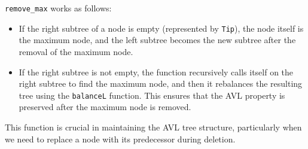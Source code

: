 \texttt{remove\_max} works as follows:
\begin{itemize}
    \item If the right subtree of a node is empty (represented by \texttt{Tip}), the node itself is the maximum node, and the left subtree becomes the new subtree after the removal of the maximum node.
    \item If the right subtree is not empty, the function recursively calls itself on the right subtree to find the maximum node, and then it rebalances the resulting tree using the \texttt{balanceL} function. This ensures that the AVL property is preserved after the maximum node is removed.
\end{itemize}

This function is crucial in maintaining the AVL tree structure, particularly when we need to replace a node with its predecessor during deletion.

